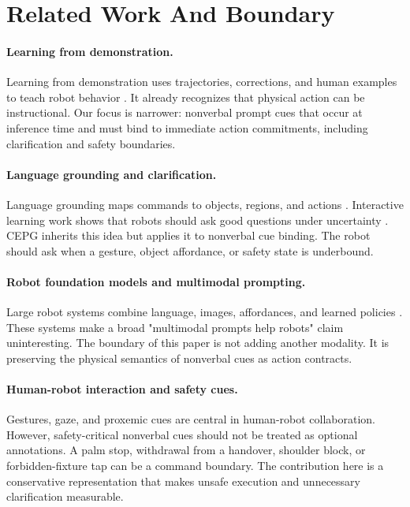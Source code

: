 \documentclass{article}
\newcommand{\method}{CEPG}
\begin{document}
\section{Related Work And Boundary}

\paragraph{Learning from demonstration.}
Learning from demonstration uses trajectories, corrections, and human examples to teach robot behavior \citep{argall2009survey}. It already recognizes that physical action can be instructional. Our focus is narrower: nonverbal prompt cues that occur at inference time and must bind to immediate action commitments, including clarification and safety boundaries.

\paragraph{Language grounding and clarification.}
Language grounding maps commands to objects, regions, and actions \citep{tellex2011understanding}. Interactive learning work shows that robots should ask good questions under uncertainty \citep{cakmak2012designing}. \method{} inherits this idea but applies it to nonverbal cue binding. The robot should ask when a gesture, object affordance, or safety state is underbound.

\paragraph{Robot foundation models and multimodal prompting.}
Large robot systems combine language, images, affordances, and learned policies \citep{ahn2022saycan, brohan2023rt1, driess2023palme, jiang2023vima, chi2023diffusion}. These systems make a broad "multimodal prompts help robots" claim uninteresting. The boundary of this paper is not adding another modality. It is preserving the physical semantics of nonverbal cues as action contracts.

\paragraph{Human-robot interaction and safety cues.}
Gestures, gaze, and proxemic cues are central in human-robot collaboration. However, safety-critical nonverbal cues should not be treated as optional annotations. A palm stop, withdrawal from a handover, shoulder block, or forbidden-fixture tap can be a command boundary. The contribution here is a conservative representation that makes unsafe execution and unnecessary clarification measurable.
\end{document}
